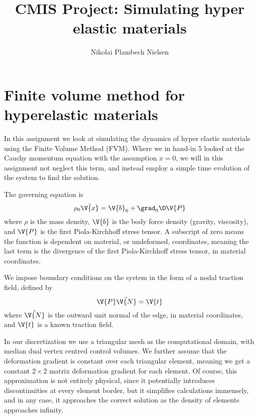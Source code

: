 \documentclass[sigconf]{acmart}
\begin{document}
%
\title{CMIS Project: Simulating hyper elastic materials}

\author{Nikolai Plambech Nielsen}


\maketitle

\section{Finite volume method for hyperelastic materials}
In this assignment we look at simulating the dynamics of hyper elastic materials using the Finite Volume Method (FVM). Where we in hand-in 5 looked at the Cauchy momentum equation with the assumption $ \ddot{x}=0 $, we will in this assignment not neglect this term, and instead employ a simple time evolution of the system to find the solution.

The governing equation is
\begin{equation}\label{key}
	\rho_0 \ddot{\V{x}} = \V{b}_0 + \grad_{0} \D \V{P}
\end{equation}
where $ \rho $ is the mass density, $ \V{b} $ is the body force density (gravity, viscosity), and $ \V{P} $ is the first Piola-Kirchhoff stress tensor. A subscript of zero means the function is dependent on material, or undeformed, coordinates, meaning the last term is the divergence of the first Piola-Kirchhoff stress tensor, in material coordinates.

We impose boundary conditions on the system in the form of a nodal traction field, defined by
\begin{equation}\label{key}
	\V{P}\hat{\V{N}}=\V{t}
\end{equation}
where $ \hat{\V{N}} $ is the outward unit normal of the edge, in material coordinates, and $ \V{t} $ is a known traction field.

In our discretization we use a triangular mesh as the computational domain, with median dual vertex centred control volumes. We further assume that the deformation gradient is constant over each triangular element, meaning we get a constant $ 2\times 2 $ matrix deformation gradient for each element. Of course, this approximation is not entirely physical, since it potentially introduces discontinuities at every element border, but it simplifies calculations immensely, and in any case, it approaches the correct solution as the density of elements approaches infinity.
\end{document}
